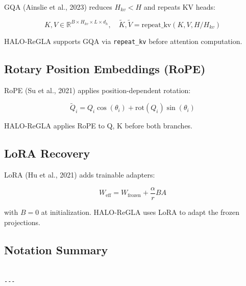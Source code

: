 GQA (Ainslie et al., 2023) reduces $H_{kv} < H$ and repeats KV heads:

\[
K, V \in \mathbb{R}^{B \times H_{kv} \times L \times d_h}, \quad
\tilde{K}, \tilde{V} = \text{repeat\_kv}(K, V, H / H_{kv})
\]

HALO-ReGLA supports GQA via \texttt{repeat\_kv} before attention computation.

\subsection{Rotary Position Embeddings (RoPE)}

RoPE (Su et al., 2021) applies position-dependent rotation:

\[
\tilde{Q}_i = Q_i \cos(\theta_i) + \mathrm{rot}(Q_i) \sin(\theta_i)
\]

HALO-ReGLA applies RoPE to Q, K before both branches.

\subsection{LoRA Recovery}

LoRA (Hu et al., 2021) adds trainable adapters:

\[
W_\text{eff} = W_\text{frozen} + \frac{\alpha}{r} B A
\]

with $B = 0$ at initialization. HALO-ReGLA uses LoRA to adapt the frozen 
projections.

\subsection{Notation Summary}

\begin{lstlisting}

---
\end{lstlisting}